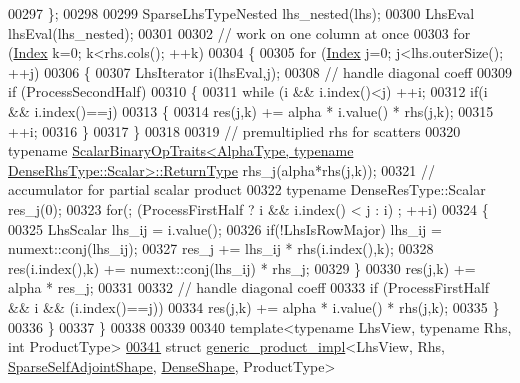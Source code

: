 \begin{DoxyCode}
00297   \};
00298   
00299   SparseLhsTypeNested lhs\_nested(lhs);
00300   LhsEval lhsEval(lhs\_nested);
00301 
00302   \textcolor{comment}{// work on one column at once}
00303   \textcolor{keywordflow}{for} (\hyperlink{namespace_eigen_a62e77e0933482dafde8fe197d9a2cfde}{Index} k=0; k<rhs.cols(); ++k)
00304   \{
00305     \textcolor{keywordflow}{for} (\hyperlink{namespace_eigen_a62e77e0933482dafde8fe197d9a2cfde}{Index} j=0; j<lhs.outerSize(); ++j)
00306     \{
00307       LhsIterator i(lhsEval,j);
00308       \textcolor{comment}{// handle diagonal coeff}
00309       \textcolor{keywordflow}{if} (ProcessSecondHalf)
00310       \{
00311         \textcolor{keywordflow}{while} (i && i.index()<j) ++i;
00312         \textcolor{keywordflow}{if}(i && i.index()==j)
00313         \{
00314           res(j,k) += alpha * i.value() * rhs(j,k);
00315           ++i;
00316         \}
00317       \}
00318 
00319       \textcolor{comment}{// premultiplied rhs for scatters}
00320       \textcolor{keyword}{typename} 
      \hyperlink{group___core___module_struct_eigen_1_1_scalar_binary_op_traits}{ScalarBinaryOpTraits<AlphaType, typename DenseRhsType::Scalar>::ReturnType}
       rhs\_j(alpha*rhs(j,k));
00321       \textcolor{comment}{// accumulator for partial scalar product}
00322       \textcolor{keyword}{typename} DenseResType::Scalar res\_j(0);
00323       \textcolor{keywordflow}{for}(; (ProcessFirstHalf ? i && i.index() < j : i) ; ++i)
00324       \{
00325         LhsScalar lhs\_ij = i.value();
00326         \textcolor{keywordflow}{if}(!LhsIsRowMajor) lhs\_ij = numext::conj(lhs\_ij);
00327         res\_j += lhs\_ij * rhs(i.index(),k);
00328         res(i.index(),k) += numext::conj(lhs\_ij) * rhs\_j;
00329       \}
00330       res(j,k) += alpha * res\_j;
00331 
00332       \textcolor{comment}{// handle diagonal coeff}
00333       \textcolor{keywordflow}{if} (ProcessFirstHalf && i && (i.index()==j))
00334         res(j,k) += alpha * i.value() * rhs(j,k);
00335     \}
00336   \}
00337 \}
00338 
00339 
00340 \textcolor{keyword}{template}<\textcolor{keyword}{typename} LhsView, \textcolor{keyword}{typename} Rhs, \textcolor{keywordtype}{int} ProductType>
\hyperlink{struct_eigen_1_1internal_1_1generic__product__impl_3_01_lhs_view_00_01_rhs_00_01_sparse_self_adj0d7cb22d06770c150f0f74fa6f4e5968}{00341} \textcolor{keyword}{struct }\hyperlink{struct_eigen_1_1internal_1_1generic__product__impl}{generic\_product\_impl}<LhsView, Rhs, 
      \hyperlink{struct_eigen_1_1internal_1_1_sparse_self_adjoint_shape}{SparseSelfAdjointShape}, \hyperlink{struct_eigen_1_1_dense_shape}{DenseShape}, ProductType>

\end{DoxyCode}
